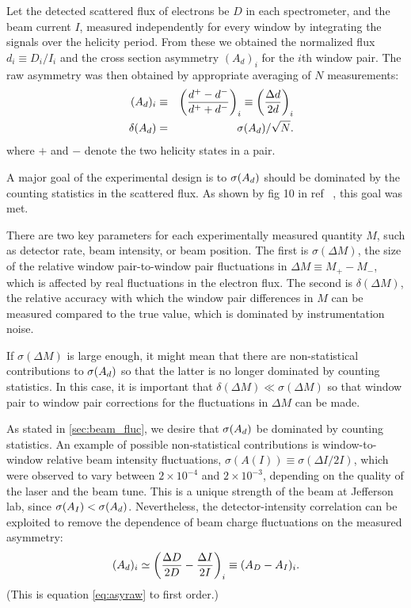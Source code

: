 Let the detected scattered flux of electrons be $D$ in each spectrometer,
and the beam current $I$,
measured independently for every window
by integrating the signals over the helicity period.  From these 
we obtained the normalized flux $d_i \equiv D_i/I_i$ and 
the cross section asymmetry $(A_d)_i$ for the
$i$th window pair. The raw asymmetry was then obtained by
appropriate averaging of $N$ measurements:
%
\begin{eqnarray} \label{eq:asyraw}
(A_d)_i & \equiv &
{\left(\frac{d^+-d^-}
{d^++d^-}\right)}_i 
\equiv {\left(\frac{\Delta d}
{2d}\right)}_i 
\nonumber \\
\quad \delta(A_d) & = &
\sigma(A_d)/\sqrt{N}. \label{eqn:pulsepair}
\end{eqnarray}
%
where $+$ and $-$ denote the two helicity states in a pair.

A major goal of the experimental design is to $\sigma(A_d)$ should be
dominated by the counting statistics in the scattered flux.
As shown by fig 10 in ref ~\cite{ref:pvdis_nim}, this goal was met.

There are two key parameters for each experimentally measured
quantity $M$, such as detector rate, beam intensity, or beam position. 
The first is $\sigma(\Delta M)$, the size of the relative 
window pair-to-window pair
fluctuations in $\Delta M\equiv M_{+} - M_{-}$, which is affected by
real fluctuations in the electron flux. The second is
$\delta(\Delta M)$, the relative accuracy with which the window
pair differences in $M$ can be measured compared to the true
value, which is dominated by instrumentation noise.

If $\sigma(\Delta M)$ is large enough, it might mean that there
are non-statistical contributions to $\sigma(A_d)$ so that the
latter is no longer dominated by counting statistics. In this
case, it is important that $\delta(\Delta M)\ll\sigma(\Delta M)$ so
that window pair to window pair corrections for the fluctuations
in $\Delta M$ can be made.

As stated in \ref{sec:beam_fluc}, we desire that
$\sigma(A_d)$ be dominated by counting statistics.
An example of possible non-statistical contributions
is window-to-window relative beam intensity
fluctuations, $\sigma(A(I)) \equiv \sigma(\Delta I/2I)$,
which were observed to vary between $2\times 10^{-4}$ and
$2\times 10^{-3}$, depending on the quality of the laser and the
beam tune. This is a unique strength of the beam at 
Jefferson lab, since $\sigma(A_I)<\sigma(A_d)$. 
Nevertheless, the
detector-intensity correlation can be exploited to remove the
dependence of beam charge fluctuations on the measured asymmetry:
\begin{equation}
(A_d)_i \simeq
\left(\frac{\Delta D}{2D} - \frac{\Delta I}{2I}\right)_i \equiv
(A_D - A_I)_i.
\end{equation}
(This is equation \ref{eq:asyraw}
to first order.)

